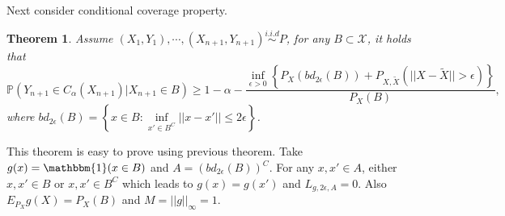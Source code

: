 \documentclass[12pt, a4paper, oneside]{article}
\newtheorem{theorem}{Theorem}[section]
\begin{document}
    Next consider conditional coverage property.
    \begin{theorem}
        Assume $(X_1,Y_1),\cdots,(X_{n+1},Y_{n+1})\overset{i.i.d}{\sim}P$, for any $B\subset\mathcal{X}$, it holds that
        \begin{equation*}
            \mathbb{P}\left( Y_{n+1}\in C_\alpha(X_{n+1})\Big|X_{n+1}\in B \right)\geq 1-\alpha-\dfrac{\underset{\epsilon>0}{\inf}\left\{ P_X(bd_{2\epsilon}(B))+P_{X,\tilde{X}}\left( ||X-\tilde{X}||>\epsilon \right) \right\}}{P_X(B)},
        \end{equation*}
        where $bd_{2\epsilon}(B)=\left\{ x\in B:\underset{x'\in B^C}{\inf}||x-x'||\leq 2\epsilon\right\}$.
    \end{theorem}
    This theorem is easy to prove using previous theorem. Take $g(x)=\mathbbm{1}(x\in B)$ and $A=(bd_{2\epsilon}(B))^C$. For any $x,x'\in A$, either $x,x'\in B$ or $x,x'\in B^C$ which leads to $g(x)=g(x')$ and $L_{g,2\epsilon,A}=0$. Also $E_{P_X}g(X)=P_X(B)$ and $M=||g||_\infty=1$.
\newpage


\end{document}
